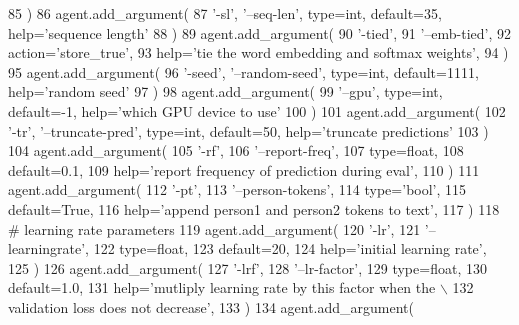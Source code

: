 \begin{DoxyCode}
85         )
86         agent.add\_argument(
87             \textcolor{stringliteral}{'-sl'}, \textcolor{stringliteral}{'--seq-len'}, type=int, default=35, help=\textcolor{stringliteral}{'sequence length'}
88         )
89         agent.add\_argument(
90             \textcolor{stringliteral}{'-tied'},
91             \textcolor{stringliteral}{'--emb-tied'},
92             action=\textcolor{stringliteral}{'store\_true'},
93             help=\textcolor{stringliteral}{'tie the word embedding and softmax weights'},
94         )
95         agent.add\_argument(
96             \textcolor{stringliteral}{'-seed'}, \textcolor{stringliteral}{'--random-seed'}, type=int, default=1111, help=\textcolor{stringliteral}{'random seed'}
97         )
98         agent.add\_argument(
99             \textcolor{stringliteral}{'--gpu'}, type=int, default=-1, help=\textcolor{stringliteral}{'which GPU device to use'}
100         )
101         agent.add\_argument(
102             \textcolor{stringliteral}{'-tr'}, \textcolor{stringliteral}{'--truncate-pred'}, type=int, default=50, help=\textcolor{stringliteral}{'truncate predictions'}
103         )
104         agent.add\_argument(
105             \textcolor{stringliteral}{'-rf'},
106             \textcolor{stringliteral}{'--report-freq'},
107             type=float,
108             default=0.1,
109             help=\textcolor{stringliteral}{'report frequency of prediction during eval'},
110         )
111         agent.add\_argument(
112             \textcolor{stringliteral}{'-pt'},
113             \textcolor{stringliteral}{'--person-tokens'},
114             type=\textcolor{stringliteral}{'bool'},
115             default=\textcolor{keyword}{True},
116             help=\textcolor{stringliteral}{'append person1 and person2 tokens to text'},
117         )
118         \textcolor{comment}{# learning rate parameters}
119         agent.add\_argument(
120             \textcolor{stringliteral}{'-lr'},
121             \textcolor{stringliteral}{'--learningrate'},
122             type=float,
123             default=20,
124             help=\textcolor{stringliteral}{'initial learning rate'},
125         )
126         agent.add\_argument(
127             \textcolor{stringliteral}{'-lrf'},
128             \textcolor{stringliteral}{'--lr-factor'},
129             type=float,
130             default=1.0,
131             help=\textcolor{stringliteral}{'mutliply learning rate by this factor when the \(\backslash\)}
132 \textcolor{stringliteral}{                           validation loss does not decrease'},
133         )
134         agent.add\_argument(

\end{DoxyCode}
